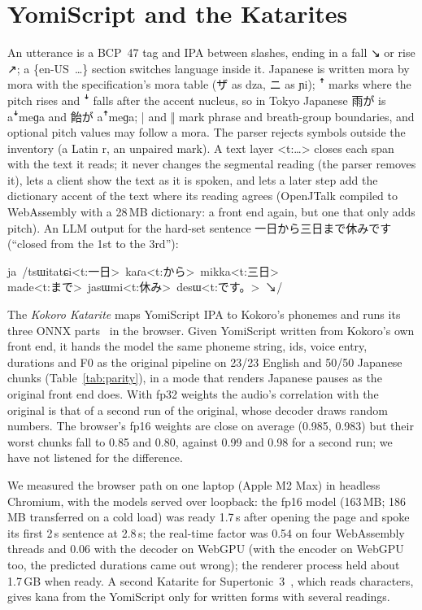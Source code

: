 \documentclass{Interspeech}
\newcommand{\ys}[1]{\mbox{\ipafont #1}}
\begin{document}
\section{YomiScript and the Katarites}

An utterance is a BCP~47 tag and IPA between slashes, ending in a fall \ys{↘} or rise \ys{↗}; a \ys{\{en-US …\}}
section switches language inside it. Japanese is written mora by mora with the specification's mora table (ザ as
\ys{dza}, ニ as \ys{ɲi}); \ys{ꜛ} marks where the pitch rises and \ys{ꜜ} falls after the accent nucleus, so in Tokyo
Japanese 雨が is \ys{aꜜmeɡa} and 飴が \ys{aꜛmeɡa}; \ys{|} and \ys{‖} mark phrase and breath-group
boundaries, and optional pitch values may follow a mora. The parser rejects symbols outside the inventory (a Latin
\ys{r}, an unpaired mark). A text layer \ys{<t:…>} closes each span with the text it reads; it never
changes the segmental reading (the parser removes it), lets a client show the text as it is spoken, and lets a later
step add the dictionary accent of the text where its reading agrees (OpenJTalk compiled to WebAssembly with a 28\,MB
dictionary: a front end again, but one that only adds pitch). An LLM output for the hard-set sentence 一日から三日まで休みです
(``closed from the 1st to the 3rd''):

\begin{center}\footnotesize
\ys{ja /tsɯitatɕi<t:一日> kaɾa<t:から> mikka<t:三日>}\\
\ys{made<t:まで> jasɯmi<t:休み> desɯ<t:です。> ↘/}
\end{center}

The \emph{Kokoro Katarite} maps YomiScript IPA to Kokoro's phonemes and runs its three ONNX
parts~\cite{onnxruntime} in the browser. Given YomiScript written from Kokoro's own front end, it hands the model the
same phoneme string, ids, voice entry, durations and F0 as the original pipeline on 23/23 English and 50/50 Japanese
chunks (Table~\ref{tab:parity}), in a mode that renders Japanese pauses as the original front end does. With fp32
weights the audio's correlation with the original is that of a second run of the original, whose decoder draws
random numbers. The browser's fp16 weights are close on average (0.985, 0.983) but their worst chunks fall to 0.85
and 0.80, against 0.99 and 0.98 for a second run; we have not listened for the difference.

We measured the browser path on one laptop (Apple M2 Max) in headless Chromium, with the models served over
loopback: the fp16 model (163\,MB; 186\,MB transferred on a cold load) was ready 1.7\,s after opening the page and
spoke its first 2\,s sentence at 2.8\,s; the real-time factor was 0.54 on four WebAssembly threads and 0.06 with the
decoder on WebGPU (with the encoder on WebGPU too, the predicted durations came out wrong); the renderer process held about 1.7\,GB when ready. A second Katarite for Supertonic~3~\cite{supertonic3}, which reads characters, gives kana from the
YomiScript only for written forms with several readings.
\end{document}
